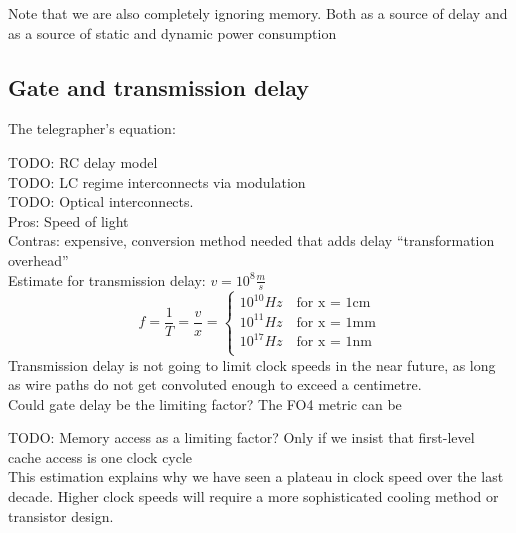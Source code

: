 \documentclass[12pt,a4paper]{article}
\newcommand{\note}{\textcolor{WildStrawberry}}
\begin{document}
\vspace{2cm}



\note{Note that we are also completely ignoring memory. Both as a source of delay and as a source of static and dynamic power consumption}

\vspace{2cm}
\subsection{Gate and transmission delay}
The telegrapher's equation:

\note{TODO: RC delay model}\\

\note{TODO: LC regime interconnects via modulation \cite{LCSpeedOfLightInterconnects}}\\

\note{TODO: Optical interconnects.\\
	Pros: Speed of light \\
	Contras: expensive, conversion method needed that adds delay ``transformation overhead''}\\

Estimate for transmission delay: $v = 10^{8}\frac{m}{s}$
\begin{equation}
f = \frac{1}{T} = \frac{v}{x} = 
\begin{cases}
	10^{10}Hz \quad \text{for x = 1cm}\\
	10^{11}Hz \quad \text{for x = 1mm}\\
	10^{17}Hz \quad \text{for x = 1nm}\\
\end{cases}
\end{equation}
Transmission delay is not going to limit clock speeds in the near future, as long as wire paths do not get convoluted enough to exceed a centimetre. \\

Could gate delay be the limiting factor?
The FO4 metric can be

\note{TODO: Memory access as a limiting factor? Only if we insist that first-level cache access is one clock cycle}\\

This estimation explains why we have seen a plateau in clock speed over the last decade. Higher clock speeds will require a more sophisticated cooling method or transistor design.
\end{document}
